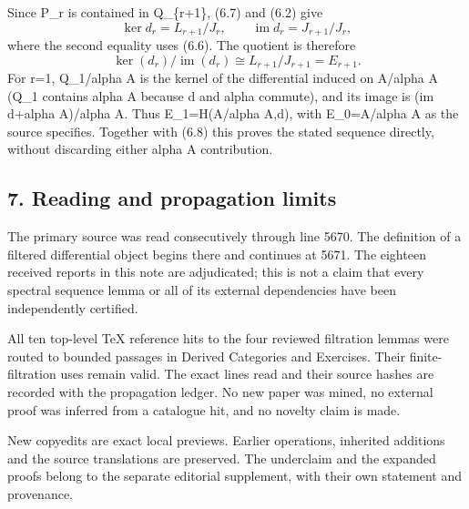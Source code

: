 Since P\_r is contained in Q\_\{r+1\}, (6.7) and (6.2) give \[
\ker d_r=L_{r+1}/J_r,\qquad
\operatorname{im}d_r=J_{r+1}/J_r,
\] where the second equality uses (6.6). The quotient is therefore \[
\ker(d_r)/\operatorname{im}(d_r)
\cong L_{r+1}/J_{r+1}=E_{r+1}.                            \tag{6.8}
\] For r=1, Q\_1/alpha A is the kernel of the differential induced on A/alpha A (Q\_1 contains alpha A because d and alpha commute), and its image is (im d+alpha A)/alpha A. Thus E\_1=H(A/alpha A,d), with E\_0=A/alpha A as the source specifies. Together with (6.8) this proves the stated sequence directly, without discarding either alpha A contribution.

\subsection{7. Reading and propagation limits}\label{note-05-reading-and-propagation-limits}

The primary source was read consecutively through line 5670. The definition of a filtered differential object begins there and continues at 5671. The eighteen received reports in this note are adjudicated; this is not a claim that every spectral sequence lemma or all of its external dependencies have been independently certified.

All ten top-level TeX reference hits to the four reviewed filtration lemmas were routed to bounded passages in Derived Categories and Exercises. Their finite-filtration uses remain valid. The exact lines read and their source hashes are recorded with the propagation ledger. No new paper was mined, no external proof was inferred from a catalogue hit, and no novelty claim is made.

New copyedits are exact local previews. Earlier operations, inherited additions and the source translations are preserved. The underclaim and the expanded proofs belong to the separate editorial supplement, with their own statement and provenance.
